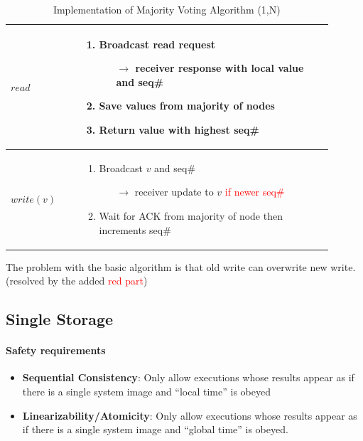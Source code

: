 \begin{table}[!ht]
    \begin{tabular}{>{\centering}m{0.2\linewidth}|m{0.7\linewidth}}
        \hline
        $read$ & \begin{enumerate}
                \item Broadcast read request
                    \begin{itemize}
                        \item[$\to$] receiver response with local value and seq\#
                    \end{itemize}
                \item Save values from majority of nodes
                \item Return value with highest seq\#
            \end{enumerate} \\
        \hline
        $write(v)$ & \begin{enumerate}
            \item Broadcast $v$ and seq\#
                \begin{itemize}
                    \item[$\to$] receiver update to $v$ \textcolor{red}{if newer seq\#}
                \end{itemize}
            \item Wait for ACK from majority of node then increments seq\#
        \end{enumerate} \\ \hline
    \end{tabular}
    \caption{Implementation of Majority Voting Algorithm (1,N)}
\end{table}
\FloatBarrier{}

The problem with the basic algorithm is that old write can overwrite
new write. (resolved by the added \textcolor{red}{red part})

\subsection{Single Storage}

\paragraph{Safety requirements}
\begin{itemize}
	\item \textbf{Sequential Consistency}: Only allow executions whose results
	appear as if there is a single system image and \enquote{local time} is
	obeyed
	\item \textbf{Linearizability/Atomicity}: Only allow executions whose
	results appear as if there is a single system image and
	\enquote{global time} is obeyed.
\end{itemize}

